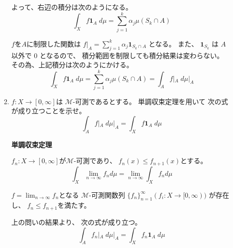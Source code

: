 \documentclass[12pt,b5paper]{ltjsarticle}
\begin{document}
\begin{enumerate}
\begin{enumerate}
            よって、右辺の積分は次のようになる。
            \begin{equation}
             \int_{X} f\mathbf{1}_{A} \;d\mu
              = \sum_{j=1}^{k}\alpha_{j} \mu(S_{k} \cap A)
            \end{equation}

            $f$を$A$に制限した関数は
            $f|_{A}=\sum_{j=1}^{k}\alpha_{j}\mathbf{1}_{S_{k} \cap A}$
            となる。
            また、
            $\mathbf{1}_{S_{k}}$ は $A$ 以外で $0$ となるので、
            積分範囲を制限しても積分結果は変わらない。
            その為、上記積分は次のようにかける。
            \begin{equation}
             \int_{X} f\mathbf{1}_{A} \;d\mu
              = \sum_{j=1}^{k}\alpha_{j} \mu(S_{k} \cap A)
              = \int_{A} f|_{A} \; d\mu|_{A}
            \end{equation}

            \hrulefill

       \item
            $f:X \to [0,\infty]$は
            $\mathcal{M}$-可測であるとする。
            単調収束定理を用いて
            次の式が成り立つことを示せ。
            \begin{equation}
             \int_{A} f|_{A} \; d\mu|_{A} = \int_{X} f\mathbf{1}_{A} \; d\mu
            \end{equation}

            \dotfill

            \textbf{単調収束定理}

            $f_{n}:X\to [0,\infty]$が$\mathcal{M}$-可測であり、
            $f_{n}(x)\leq f_{n+1}(x)$とする。
            \begin{equation}
             \int_{X} \lim_{n\to\infty}f_{n} d\mu
              = \lim_{n\to\infty} \int_{X} f_{n} d\mu
            \end{equation}

            \dotfill

            $f=\lim_{n\to\infty}f_{n}$となる
            $\mathcal{M}$-可測関数列
            $\{ f_{n} \}_{n=1}^{\infty} (f_{i}:X\to[0,\infty))$
            が存在し、
            $f_{n} \leq f_{n+1}$を満たす。

            上の問いの結果より、
            次の式が成り立つ。
            \begin{equation}
             \int_{A} f_{n}|_{A} \; d\mu|_{A}
              = \int_{X} f_{n}\mathbf{1}_{A} \; d\mu
            \end{equation}


\end{enumerate}
\end{enumerate}
\end{document}
